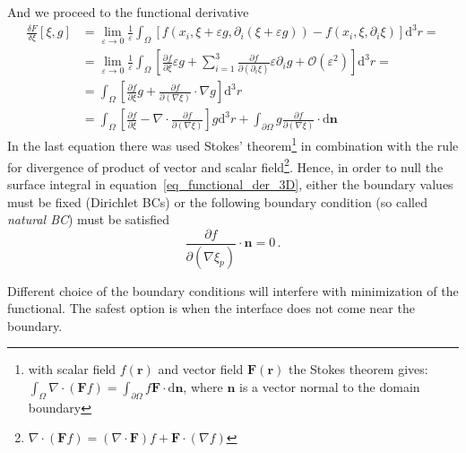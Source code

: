 And we proceed to the functional derivative
\begin{equation}
	\begin{split}\label{eq_functional_der_3D}
		\frac{\delta F}{\delta \xi}[\xi,g] &= \lim_{\varepsilon\rightarrow0}\frac{1}{\varepsilon}\int_\Omega [f(x_i,\xi+\varepsilon g,\partial_i(\xi+\varepsilon g))-f(x_i,\xi,\partial_i\xi) ]\mathrm{d}^3r = \\
		&= \lim_{\varepsilon\rightarrow0}\frac{1}{\varepsilon}\int_\Omega\left[\frac{\partial f}{\partial \xi}\varepsilon g + \sum_{i=1}^3\frac{\partial f}{\partial (\partial_i\xi)}\varepsilon \partial_i g + \mathcal{O}(\varepsilon^2)\right]\mathrm{d}^3r = \\
		&= \int_\Omega\left[\frac{\partial f}{\partial \xi} g + \frac{\partial f}{\partial (\nabla\xi)}\cdot \nabla g \right]\mathrm{d}^3r \\
		&= \int_\Omega\left[\frac{\partial f}{\partial \xi}  - \nabla\cdot\frac{\partial f}{\partial (\nabla\xi)}  \right]g\mathrm{d}^3r + \int_{\partial\Omega}g\frac{\partial f}{\partial (\nabla\xi)}\cdot\mathrm{d}\bm{n}
	\end{split}
\end{equation}
In the last equation there was used Stokes' theorem\footnote{with scalar field $f(\bm{r})$ and vector field $\bm{F}(\bm{r})$ the Stokes theorem gives: $\int_\Omega \nabla\cdot(\bm{F}f) = \int_{\partial\Omega} f\bm{F}\cdot\mathrm{d}\bm{n} $, where $\bm{n}$ is a vector normal to the domain boundary} in combination with the rule for divergence of product of vector and scalar field\footnote{ $\nabla\cdot(\bm{F}f) =  (\nabla\cdot\bm{F})f + \bm{F}\cdot(\nabla f)$}. Hence, in order to null the surface integral in equation~\ref{eq_functional_der_3D}, either the boundary values must be fixed (Dirichlet BCs) or the following boundary condition (so called \textit{natural BC}) must be satisfied
\begin{equation}
	\frac{\partial f}{\partial(\nabla \xi_p)}\cdot\bm{n}=0 \,.
\end{equation}

Different choice of the boundary conditions will interfere with minimization of the functional. The safest option is when the interface does not come near the boundary. 


\cleardoublepage

